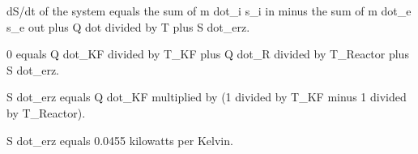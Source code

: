 dS/dt of the system equals the sum of m dot_i s_i in minus the sum of m dot_e s_e out plus Q dot divided by T plus S dot_erz.  

0 equals Q dot_KF divided by T_KF plus Q dot_R divided by T_Reactor plus S dot_erz.  

S dot_erz equals Q dot_KF multiplied by (1 divided by T_KF minus 1 divided by T_Reactor).  

S dot_erz equals 0.0455 kilowatts per Kelvin.